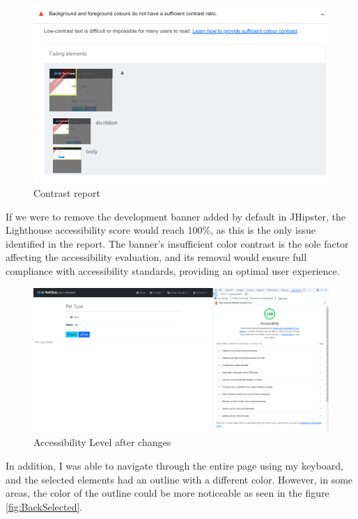 \documentclass[a4paper,11pt,openright,BCOR=15mm]{scrbook}
\begin{document}
\begin{figure}[H]
	\centering
	\includegraphics[width=\textwidth]{figs/Accessibility/NivelContraste.png}
	\caption{Contrast report}
	\label{fig:NivelContraste}
\end{figure}

If we were to remove the development banner added by default in JHipster, the Lighthouse accessibility score would reach 100\%, as this is the only issue identified in the report. The banner's insufficient color contrast is the sole factor affecting the accessibility evaluation, and its removal would ensure full compliance with accessibility standards, providing an optimal user experience.

\begin{figure}[H]
	\centering
	\includegraphics[width=\textwidth]{figs/Accessibility/NivelAcessibilidadeDepoisDaMudanca.png}
	\caption{Accessibility Level after changes}
	\label{fig:NivelContraste}
\end{figure}

In addition, I was able to navigate through the entire page using my keyboard, and the selected elements had an outline with a different color. However, in some areas, the color of the outline could be more noticeable as seen in the figure \ref{fig:BackSelected}.
\end{document}
